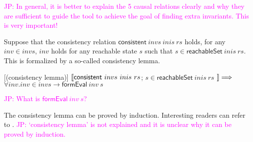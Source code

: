 \documentclass{llncs}
\newcommand\JP[1]{\textcolor{magenta}{JP: #1}}
\begin{document}
\JP{In general, it is better to explain the 5 causal relations clearly
and why they are sufficient to guide the tool to achieve the goal of finding extra invariants.
This is very important!}

Suppose that the consistency relation $\mathsf{consistent}~ invs
~inis~ rs$ holds, for any $inv \in invs$, $inv$ holds for any
reachable state $s$ such that $s  \in \mathsf{reachableSet}~ inis~
rs$. This is formalized by a so-called consistency lemma.
%
\begin{theorem}\label{consistentLemma}[(consistency lemma)]
  $\emph{$\mathopen{\lbrack\mkern-3mu\lbrack}$} \mathsf{consistent}~ invs ~inis~ rs$; $s  \in \mathsf{reachableSet}~ inis~ rs$
  $\emph{$\mathclose{\rbrack\mkern-3mu\rbrack}$}\Longrightarrow$ $\forall inv. inv \in invs \longrightarrow
\mathsf{formEval}~ inv ~s$
\end{theorem}

\JP{What is $\mathsf{formEval}~ inv ~s$?}

The consistency lemma can be proved by induction. Interesting
readers can refer to \cite{LiCache13}. \JP{`consistency lemma' is
not explained and it is unclear why it can be proved by induction.}

\end{document}
